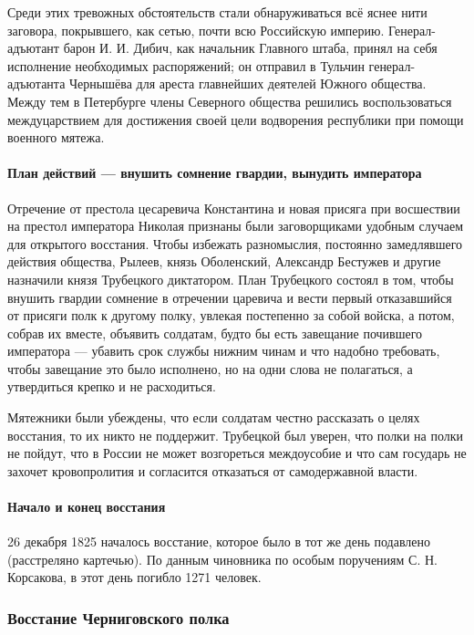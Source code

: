 \documentclass{article}
\begin{document}
Среди этих тревожных обстоятельств стали обнаруживаться всё яснее нити заговора, покрывшего, как сетью, почти всю Российскую империю. Генерал-адъютант барон И. И. Дибич, как начальник Главного штаба, принял на себя исполнение необходимых распоряжений; он отправил в Тульчин генерал-адъютанта Чернышёва для ареста главнейших деятелей Южного общества. Между тем в Петербурге члены Северного общества решились воспользоваться междуцарствием для достижения своей цели водворения республики при помощи военного мятежа.

\paragraph{План действий — внушить сомнение гвардии, вынудить императора}

Отречение от престола цесаревича Константина и новая присяга при восшествии на престол императора Николая признаны были заговорщиками удобным случаем для открытого восстания. Чтобы избежать разномыслия, постоянно замедлявшего действия общества, Рылеев, князь Оболенский, Александр Бестужев и другие назначили князя Трубецкого диктатором. План Трубецкого состоял в том, чтобы внушить гвардии сомнение в отречении царевича и вести первый отказавшийся от присяги полк к другому полку, увлекая постепенно за собой войска, а потом, собрав их вместе, объявить солдатам, будто бы есть завещание почившего императора — убавить срок службы нижним чинам и что надобно требовать, чтобы завещание это было исполнено, но на одни слова не полагаться, а утвердиться крепко и не расходиться.

Мятежники были убеждены, что если солдатам честно рассказать о целях восстания, то их никто не поддержит. Трубецкой был уверен, что полки на полки не пойдут, что в России не может возгореться междоусобие и что сам государь не захочет кровопролития и согласится отказаться от самодержавной власти.

\paragraph{Начало и конец восстания}

26 декабря 1825 началось восстание, которое было в тот же день подавлено (расстреляно картечью). По данным чиновника по особым поручениям С. Н. Корсакова, в этот день погибло 1271 человек. 

\subsubsection{Восстание Черниговского полка}
\end{document}
